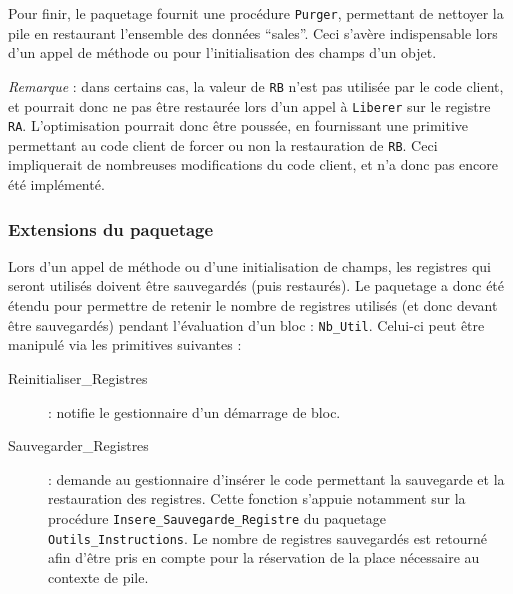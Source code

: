 Pour finir, le paquetage fournit une procédure \verb!Purger!, permettant de nettoyer la pile en restaurant l'ensemble des données ``sales''. Ceci s'avère indispensable lors d'un appel de méthode ou pour l'initialisation des champs d'un objet.

\emph{Remarque} : dans certains cas, la valeur de \verb!RB! n'est pas utilisée par le code client, et pourrait donc ne pas être restaurée lors d'un appel à \verb!Liberer! sur le registre \verb!RA!. L'optimisation pourrait donc être poussée, en fournissant une primitive permettant au code client de forcer ou non la restauration de \verb!RB!. Ceci impliquerait de nombreuses modifications du code client, et n'a donc pas encore été implémenté.

\subsubsection{Extensions du paquetage}

Lors d'un appel de méthode ou d'une initialisation de champs, les registres qui seront utilisés doivent être sauvegardés (puis restaurés). Le paquetage a donc été étendu pour permettre de retenir le nombre de registres utilisés (et donc devant être sauvegardés) pendant l'évaluation d'un bloc : \verb!Nb_Util!.
Celui-ci peut être manipulé via les primitives suivantes :
\begin{description}
\item[Reinitialiser\_Registres] : notifie le gestionnaire d'un démarrage de bloc.
\item[Sauvegarder\_Registres] : demande au gestionnaire d'insérer le code permettant la sauvegarde et la restauration des registres. Cette fonction s'appuie notamment sur la procédure \verb!Insere_Sauvegarde_Registre! du paquetage \verb!Outils_Instructions!. Le nombre de registres sauvegardés est retourné afin d'être pris en compte pour la réservation de la place nécessaire au contexte de pile.
\end{description}
